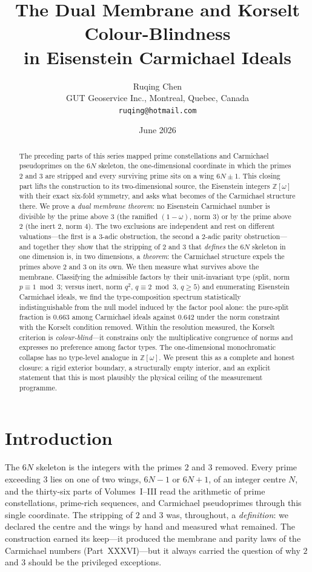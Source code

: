 \documentclass[11pt]{article}
\title{\textbf{\large The Dual Membrane and Korselt Colour-Blindness\\
in Eisenstein Carmichael Ideals}}
\author{Ruqing Chen\\
\small GUT Geoservice Inc., Montreal, Quebec, Canada\\
\small \texttt{ruqing@hotmail.com}}
\date{June 2026}
\begin{document}
\maketitle

\begin{abstract}
\noindent
The preceding parts of this series mapped prime constellations and Carmichael pseudoprimes on the
$6N$ skeleton, the one-dimensional coordinate in which the primes $2$ and $3$ are stripped and every
surviving prime sits on a wing $6N\pm1$. This closing part lifts the construction to its
two-dimensional source, the Eisenstein integers $\mathbb{Z}[\omega]$ with their exact six-fold
symmetry, and asks what becomes of the Carmichael structure there. We prove a \emph{dual membrane
theorem}: no Eisenstein Carmichael number is divisible by the prime above $3$ (the ramified
$(1-\omega)$, norm $3$) or by the prime above $2$ (the inert $2$, norm $4$). The two exclusions are
independent and rest on different valuations---the first is a $3$-adic obstruction, the second a
$2$-adic parity obstruction---and together they show that the stripping of $2$ and $3$ that
\emph{defines} the $6N$ skeleton in one dimension is, in two dimensions, a \emph{theorem}: the
Carmichael structure expels the primes above $2$ and $3$ on its own. We then measure what survives
above the membrane. Classifying the admissible factors by their unit-invariant type (split, norm
$p\equiv1\bmod3$; versus inert, norm $q^2$, $q\equiv2\bmod3$, $q\ge5$) and enumerating Eisenstein
Carmichael ideals, we find the type-composition spectrum statistically indistinguishable from the null
model induced by the factor pool alone: the pure-split fraction is $0.663$ among Carmichael ideals
against $0.642$ under the norm constraint with the Korselt condition removed. Within the resolution
measured, the Korselt criterion is \emph{colour-blind}---it constrains only the multiplicative
congruence of norms and expresses no preference among factor types. The one-dimensional monochromatic
collapse has no type-level analogue in $\mathbb{Z}[\omega]$. We present this as a complete and honest
closure: a rigid exterior boundary, a structurally empty interior, and an explicit statement that this
is most plausibly the physical ceiling of the measurement programme.
\end{abstract}

\section{Introduction}
The $6N$ skeleton is the integers with the primes $2$ and $3$ removed. Every prime exceeding $3$ lies
on one of two wings, $6N-1$ or $6N+1$, of an integer centre $N$, and the thirty-six parts of
Volumes~I--III read the arithmetic of prime constellations, prime-rich sequences, and Carmichael
pseudoprimes through this single coordinate. The stripping of $2$ and $3$ was, throughout, a
\emph{definition}: we declared the centre and the wings by hand and measured what remained. The
construction earned its keep---it produced the membrane and parity laws of the Carmichael numbers
(Part~XXXVI)---but it always carried the question of why $2$ and $3$ should be the privileged
exceptions.
\end{document}
